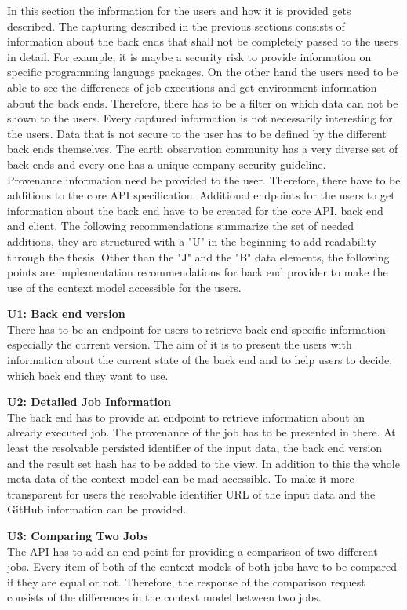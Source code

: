 \documentclass[draft,final]{vutinfth} %
\begin{document}
In this section the information for the users and how it is provided gets described. The capturing described in the previous sections consists of information about the back ends that shall not be completely passed to the users in detail. For example, it is maybe a security risk to provide information on specific programming language packages. On the other hand the users need to be able to see the differences of job executions and get environment information about the back ends. Therefore, there has to be a filter on which data can not be shown to the users. Every captured information is not necessarily interesting for the users. Data that is not secure to the user has to be defined by the different back ends themselves. The earth observation community has a very diverse set of back ends and every one has a unique company security guideline.\\ 
Provenance information need be provided to the user. Therefore, there have to be additions to the core API specification. Additional endpoints for the users to get information about the back end have to be created for the core API, back end and client. The following recommendations summarize the set of needed additions, they are structured with a "U" in the beginning to add readability through the thesis. Other than the "J" and the "B" data elements, the following points are implementation recommendations for back end provider to make the use of the context model accessible for the users.

\textbf{U1: Back end version} \\
There has to be an endpoint for users to retrieve back end specific information especially the current version. The aim of it is to present the users with information about the current state of the back end and to help users to decide, which back end they want to use. 

\textbf{U2: Detailed Job Information} \\
The back end has to provide an endpoint to retrieve information about an already executed job. The provenance of the job has to be presented in there. At least the resolvable persisted identifier of the input data, the back end version and the result set hash has to be added to the view. In addition to this the whole meta-data of the context model can be mad accessible. To make it more transparent for users the resolvable identifier URL of the input data and the GitHub information can be provided.   

\textbf{U3: Comparing Two Jobs} \\
The API has to add an end point for providing a comparison of two different jobs.  Every item of both of the context models of both jobs have to be compared if they are equal or not. Therefore, the response of the comparison request consists of the differences in the context model between two jobs.
\end{document}
